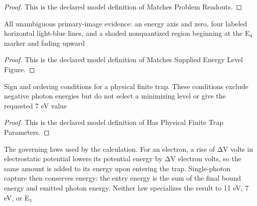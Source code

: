 \begin{proof}
  This is the declared model definition of Matches Problem Readouts.
\end{proof}
\begin{definition}
  \label{def:physics:phyx-mini-0585:phyxminiproblems-problemphyxmini0585-matchessuppliedenergylevelfigure}
  All unambiguous primary-image evidence: an energy axis and zero, four labeled horizontal light-blue lines, and a shaded nonquantized region beginning at the E₄ marker and fading upward
\end{definition}
\begin{proof}
  This is the declared model definition of Matches Supplied Energy Level Figure.
\end{proof}
\begin{definition}
  \label{def:physics:phyx-mini-0585:phyxminiproblems-problemphyxmini0585-hasphysicalfinitetrapparameters}
  Sign and ordering conditions for a physical finite trap. These conditions exclude negative photon energies but do not select a minimizing level or give the requested 7 eV value
\end{definition}
\begin{proof}
  This is the declared model definition of Has Physical Finite Trap Parameters.
\end{proof}
\begin{definition}
  \label{def:physics:phyx-mini-0585:phyxminiproblems-problemphyxmini0585-satisfieselectronentryandcapturelaws}
  The governing laws used by the calculation. For an electron, a rise of ΔV volts in electrostatic potential lowers its potential energy by ΔV electron volts, so the same amount is added to its energy upon entering the trap. Single-photon capture then conserves energy: the entry energy is the sum of the final bound energy and emitted photon energy. Neither law specializes the result to 11 eV, 7 eV, or E₃
\end{definition}
